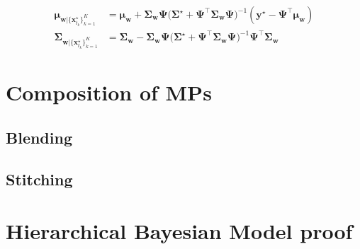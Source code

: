 \documentclass{article}
\begin{document}
\begin{align}
\bm{\mu}_{\bm{w}|\{\bm{x}_{t_k}^\star\}_{k=1}^K} &= \bm{\mu_w} + \bm{\Sigma_w}\bm{\Psi} \Big(\bm{\Sigma}^\star + \bm{\Psi}^\top \bm{\Sigma_w}\bm{\Psi} \Big)^{-1} (\bm{y}^\star - \bm{\Psi}^\top \bm{\mu_w})\\
\bm{\Sigma}_{\bm{w}|\{\bm{x}_{t_k}^\star\}_{k=1}^K} &= \bm{\Sigma_w} - \bm{\Sigma_w}\bm{\Psi} \Big(\bm{\Sigma}^\star + \bm{\Psi}^\top \bm{\Sigma_w}\bm{\Psi} \Big)^{-1} \bm{\Psi}^\top \bm{\Sigma_w}
\end{align}


\section{Composition of MPs}
\subsection{Blending}
\subsection{Stitching}







\appendix
\section{Hierarchical Bayesian Model proof}
\end{document}
